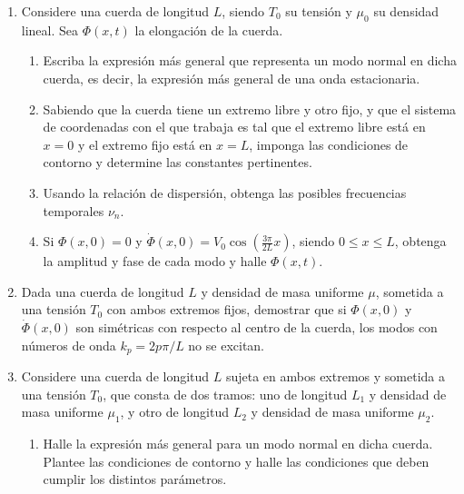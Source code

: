 \documentclass[11pt,spanish]{article}
\begin{document}
\begin{enumerate}

    \item Considere una cuerda de longitud $L$, siendo $T_{0}$ su tensión y
    $\mu_{0}$ su densidad lineal. Sea $\Phi(x,t)$ la elongación de la cuerda.

    \begin{enumerate}
        \item Escriba la expresión más general que representa un modo normal en
        dicha cuerda, es decir, la expresión más general de una onda
        estacionaria.

        \item Sabiendo que la cuerda tiene un extremo libre y otro fijo, y que
        el sistema de coordenadas con el que trabaja es tal que el extremo libre
        está en $x=0$ y el extremo fijo está en $x=L$, imponga las condiciones
        de contorno y determine las constantes pertinentes.

        \item Usando la relación de dispersión, obtenga las posibles frecuencias
        temporales $\nu_{n}$.

        \item Si $\Phi(x,0)=0$ y $\dot{\Phi}(x,0)=V_{0}\cos\left(\frac{3\pi}{2L}x\right)$,
        siendo $0\le x\le L$, obtenga la amplitud y fase de cada modo y halle
        $\Phi(x,t)$.
    \end{enumerate}


    \item Dada una cuerda de longitud $L$ y densidad de masa uniforme $\mu$,
    sometida a una tensión $T_{0}$ con ambos extremos fijos, demostrar que si
    $\Phi(x,0)$ y $\dot{\Phi}(x,0)$ son simétricas con respecto al centro de la
    cuerda, los modos con números de onda $k_{p}=2p\pi/L$ no se excitan.


    \item Considere una cuerda de longitud $L$ sujeta en ambos extremos y
    sometida a una tensión $T_{0}$, que consta de dos tramos: uno de longitud
    $L_{1}$ y densidad de masa uniforme $\mu_{1}$, y otro de longitud
    $L_{2}$ y densidad de masa uniforme $\mu_{2}$.

    \begin{enumerate}
        \item Halle la expresión más general para un modo normal en dicha
        cuerda. Plantee las condiciones de contorno y halle las condiciones que
        deben cumplir los distintos parámetros.


\end{enumerate}
\end{enumerate}
\end{document}
